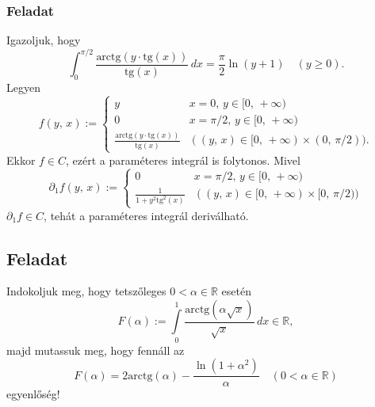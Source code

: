 \documentclass{article}
\newcommand{\R}{\mathbb{R}}
\begin{document}
	\subsubsection{Feladat}
	Igazoljuk, hogy
	\[
		\int_0^{\pi / 2} \frac{\text{arctg} (y \cdot \text{tg}(x))}{\text{tg}(x)} \, dx = \frac{\pi}{2} \ln(y + 1) \quad (y \geq 0).
	\]
	Legyen
	\[
		f(y, \, x) := \begin{cases}
			y & x = 0, \, y \in [0, \, + \infty) \\
			0 & x = \pi / 2, \, y \in [0, \, + \infty) \\
			\displaystyle \frac{\text{arctg} (y \cdot \text{tg}(x))}{\text{tg}(x)} & ((y, \, x) \in [0, \, +\infty) \times (0, \, \pi / 2)).	
		\end{cases}
	\]
	Ekkor $f \in C$, ezért a paraméteres integrál is folytonos. Mivel
	\[
		\partial_1 f(y, \, x) := \begin{cases}
			0 & x = \pi / 2, \, y \in [0, \, + \infty) \\
			\displaystyle \frac{1}{1 + y^2 \text{tg}^2(x)} & ((y, \, x) \in [0, \, +\infty) \times [0, \, \pi / 2))
		\end{cases}
	\]
	$\partial_1f \in C$, tehát a paraméteres integrál deriválható.


	\subsection{Feladat}
	Indokoljuk meg, hogy tetszőleges $0 < \alpha \in \R$ esetén
	\[
		F(\alpha) := \int\limits_0^1 \frac{\text{arctg}(\alpha \sqrt{x})}{\sqrt{x}} \, dx \in \R,
	\]
	majd mutassuk meg, hogy fennáll az
	\[
		F(\alpha) = 2 \text{arctg}(\alpha) - \frac{\ln(1+\alpha^2)}{\alpha} \quad (0 < \alpha \in \R)
	\]
	egyenlőség!\\
\end{document}
